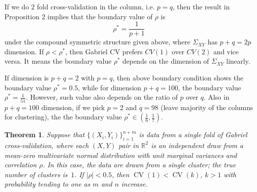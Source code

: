 \documentclass[12pt]{article}
\newtheorem{theorem}{Theorem}
\newcommand{\CV}{\operatorname{CV}}
\newcommand{\R}{\mathbb{R}}
\begin{document}
If we do $2$ fold cross-validation in the column, i.e. $p=q$, then the result in Proposition $2$ implies that the boundary value of $\rho$ is 
\[
	\rho^* = \frac{1}{p+1}
\]
under the compound symmetric structure given above, where $\Sigma_{XY}$ has $p+q=2p$ dimension. If $\rho < \rho^*$, then Gabriel CV prefers $CV(1)$ over $CV(2)$ and vice versa. It means the boundary value $\rho^*$ depends on the dimension of $\Sigma_{XY}$ linearly. 

If dimension is $p+q = 2$ with $p=q$, then above boundary condition shows the boundary value $\rho^* = 0.5$, while for dimension $p+q = 100$, the  boundary value $\rho^* = \frac{1}{51}$. However, such value also depends on the ratio of $p$ over $q$. Also in $p+q = 100$ dimension, if we pick $p=2$ and $q=98$ (leave majority of the columns for clustering), the the boundary value $\rho^* \in (\frac{1}{6},\frac{1}{7})$. 

\begin{theorem}
Suppose that $\{ (X_i, Y_i) \}_{i=1}^{n + m}$ is data from a single fold
of Gabriel cross-validation, where each $(X,Y)$ pair in $\R^2$ is an
independent draw from a mean-zero multivariate normal distribution with unit
marginal variances and correlation $\rho$.  In this case, the data are drawn
from a single cluster; the true number of clusters is~$1$.  If $|\rho| < 0.5$,
then $\CV(1) < \CV(k)$, $k > 1$ with probability tending to one as $m$ and $n$ increase.
\end{theorem}
\end{document}
